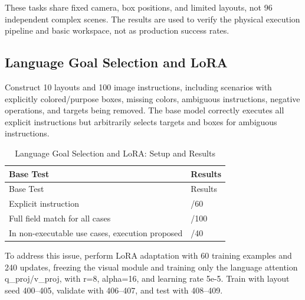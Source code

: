 These tasks share fixed camera, box positions, and limited layouts, not 96 independent complex scenes. The results are used to verify the physical execution pipeline and basic workspace, not as production success rates.

\subsection{Language Goal Selection and LoRA}\label{s05-detail-3}

Construct 10 layouts and 100 image instructions, including scenarios with explicitly colored/purpose boxes, missing colors, ambiguous instructions, negative operations, and targets being removed. The base model correctly executes all explicit instructions but arbitrarily selects targets and boxes for ambiguous instructions.

\FloatBarrier\begingroup\small\setlength{\tabcolsep}{2.5pt}
\begin{longtable}[]{@{}
  >{\raggedright\arraybackslash}p{}
  >{\raggedleft\arraybackslash}p{}@{}}
\caption{Language Goal Selection and LoRA: Setup and Results}\label{tab:s05-3}\tabularnewline
\toprule\noalign{}
\begin{minipage}[b]{\linewidth}\raggedright
Base Test
\end{minipage} & \begin{minipage}[b]{\linewidth}\raggedleft
Results
\end{minipage} \\
\midrule\noalign{}
\endfirsthead
\toprule\noalign{}
\begin{minipage}[b]{\linewidth}\raggedright
Base Test
\end{minipage} & \begin{minipage}[b]{\linewidth}\raggedleft
Results
\end{minipage} \\
\midrule\noalign{}
\endhead
\bottomrule\noalign{}
\endlastfoot
Explicit instruction & 60/60 \\
Full field match for all cases & 87/100 \\
In non-executable use cases, execution proposed & 10/40 \\
\end{longtable}\endgroup

To address this issue, perform LoRA adaptation with 60 training examples and 240 updates, freezing the visual module and training only the language attention q\_proj/v\_proj, with r=8, alpha=16, and learning rate 5e-5. Train with layout seed 400--405, validate with 406--407, and test with 408--409.

